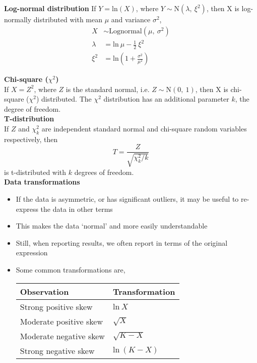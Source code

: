 \documentclass[a4paper]{article}
\newcommand{\heading}[1]{{\small\textbf{#1}}}
\newcommand{\subheading}[1]{{\scriptsize\textbf{#1}}}
\begin{document}
\begin{multicols*}{4}
\subheading{Log-normal distribution}
If $Y = \mathrm{ln}(X)$, where $Y\sim \mathrm{N}(\lambda,\ \xi^2)$, 
then X is log-normally distributed with mean $\mu$ and variance 
$\sigma^2$,
    \begin{align*}
        X       &\sim \text{Lognormal}(\mu,\ \sigma^2)\\
        \lambda &= \mathrm{ln}\ \mu - \frac{1}{2}\ \xi^2\\
        \xi^2   &= \mathrm{ln}\left ( 1 + \frac{\sigma^2}{\mu^2} \right )
    \end{align*}

\subheading{Chi-square ($\chi^2$)}\\
If $X = Z^2$, where $Z$ is the standard normal, i.e. 
$Z\sim \mathrm{N}(0,\ 1)$, then X is chi-square ($\chi^2$) distributed.
The $\chi^2$ distribution has an additional parameter $k$, the degree of
freedom. \\

\subheading{T-distribution}\\
If $Z$ and $\chi^2_k$ are independent standard normal and chi-square
random variables respectively, then
    $$ T = \frac{Z}{\sqrt{\chi^2_k / k}} $$
is t-distributed with $k$ degrees of freedom.\\

\heading{Data transformations}
\begin{itemize} \itemsep -0.5em
    \item If the data is asymmetric, or has significant outliers, it may
        be useful to re-express the data in other terms
    \item This makes the data `normal' and more easily understandable
    \item Still, when reporting results, we often report in terms of the
        original expression
    \item Some common transformations are,

    \begin{tabular}{|l|l|}
    \hline
    \textbf{Observation} & \textbf{Transformation} \\
    \hline
    Strong positive skew & $\mathrm{ln}\ X$ \\
    Moderate positive skew & $\sqrt{X} $ \\
    Moderate negative skew & $\sqrt{K-X} $ \\
    Strong negative skew & $\mathrm{ln}\ (K-X) $ \\
    \hline
    \end{tabular}


\end{itemize}
\end{multicols*}
\end{document}
